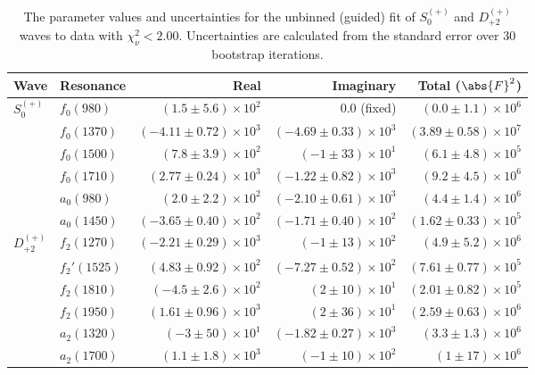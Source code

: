 \begin{table}[ht]
    \begin{center}
        \begin{tabular}{llrrr}\toprule
        Wave & Resonance & Real & Imaginary & Total ($\abs{F}^2$) \\\midrule
$S_{0}^{(+)}$ & $f_{0}(980)$ & $(1.5 \pm 5.6) \times 10^{2}$ & $0.0$ (fixed) & $(0.0 \pm 1.1) \times 10^{6}$ \\
 & $f_{0}(1370)$ & $(-4.11 \pm 0.72) \times 10^{3}$ & $(-4.69 \pm 0.33) \times 10^{3}$ & $(3.89 \pm 0.58) \times 10^{7}$ \\
 & $f_{0}(1500)$ & $(7.8 \pm 3.9) \times 10^{2}$ & $(-1 \pm 33) \times 10^{1}$ & $(6.1 \pm 4.8) \times 10^{5}$ \\
 & $f_{0}(1710)$ & $(2.77 \pm 0.24) \times 10^{3}$ & $(-1.22 \pm 0.82) \times 10^{3}$ & $(9.2 \pm 4.5) \times 10^{6}$ \\
 & $a_{0}(980)$ & $(2.0 \pm 2.2) \times 10^{2}$ & $(-2.10 \pm 0.61) \times 10^{3}$ & $(4.4 \pm 1.4) \times 10^{6}$ \\
 & $a_{0}(1450)$ & $(-3.65 \pm 0.40) \times 10^{2}$ & $(-1.71 \pm 0.40) \times 10^{2}$ & $(1.62 \pm 0.33) \times 10^{5}$ \\
$D_{+2}^{(+)}$ & $f_{2}(1270)$ & $(-2.21 \pm 0.29) \times 10^{3}$ & $(-1 \pm 13) \times 10^{2}$ & $(4.9 \pm 5.2) \times 10^{6}$ \\
 & $f_{2}'(1525)$ & $(4.83 \pm 0.92) \times 10^{2}$ & $(-7.27 \pm 0.52) \times 10^{2}$ & $(7.61 \pm 0.77) \times 10^{5}$ \\
 & $f_{2}(1810)$ & $(-4.5 \pm 2.6) \times 10^{2}$ & $(2 \pm 10) \times 10^{1}$ & $(2.01 \pm 0.82) \times 10^{5}$ \\
 & $f_{2}(1950)$ & $(1.61 \pm 0.96) \times 10^{3}$ & $(2 \pm 36) \times 10^{1}$ & $(2.59 \pm 0.63) \times 10^{6}$ \\
 & $a_{2}(1320)$ & $(-3 \pm 50) \times 10^{1}$ & $(-1.82 \pm 0.27) \times 10^{3}$ & $(3.3 \pm 1.3) \times 10^{6}$ \\
 & $a_{2}(1700)$ & $(1.1 \pm 1.8) \times 10^{3}$ & $(-1 \pm 10) \times 10^{2}$ & $(1 \pm 17) \times 10^{6}$ \\\bottomrule
        \end{tabular}
    \caption{The parameter values and uncertainties for the unbinned (guided) fit of $S_{0}^{(+)}$ and $D_{+2}^{(+)}$ waves to data with $\chi^2_\nu < 2.00$. Uncertainties are calculated from the standard error over $30$ bootstrap iterations.}\label{tab:unbinned-fit-chisqdof-2.0-guided-Sp0p-Dp2p}
    \end{center}
\end{table}
